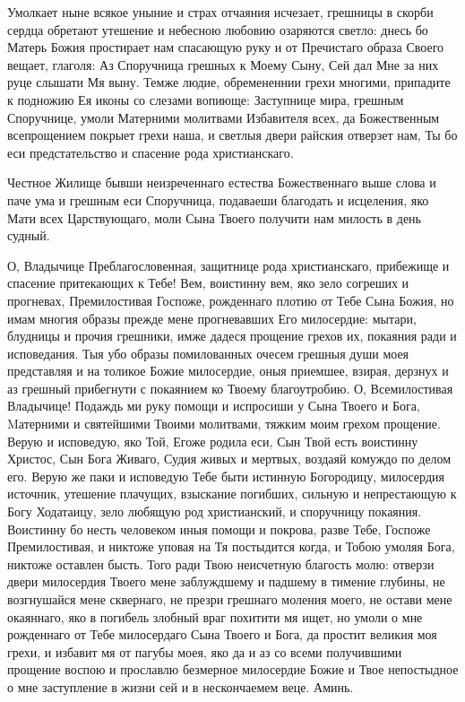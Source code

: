 \begin{mymulticols}



Умолкает ныне всякое уныние и страх отчаяния исчезает, грешницы в скорби сердца обретают утешение и небесною любовию озаряются светло: днесь бо Матерь Божия простирает нам спасающую руку и от Пречистаго образа Своего вещает, глаголя: Аз Споручница грешных к Моему Сыну, Сей дал Мне за них руце слышати Мя выну. Темже людие, обремененнии грехи многими, припадите к подножию Ея иконы со слезами вопиюще: Заступнице мира, грешным Споручнице, умоли Матерними молитвами Избавителя всех, да Божественным всепрощением покрыет грехи наша, и светлыя двери райския отверзет нам, Ты бо еси предстательство и спасение рода христианскаго.


Честное Жилище бывши неизреченнаго естества Божественнаго выше слова и паче ума и грешным еси Споручница, подаваеши благодать и исцеления, яко Мати всех Царствующаго, моли Сына Твоего получити нам милость в день судный.


О, Владычице Преблагословенная, защитнице рода христианскаго, прибежище и спасение притекающих к Тебе! Вем, воистинну вем, яко зело согреших и прогневах, Премилостивая Госпоже, рожденнаго плотию от Тебе Сына Божия, но имам многия образы прежде мене прогневавших Его милосердие: мытари, блудницы и прочия грешники, имже дадеся прощение грехов их, покаяния ради и исповедания. Тыя убо образы помилованных очесем грешныя души моея представляя и на толикое Божие милосердие, оныя приемшее, взирая, дерзнух и аз грешный прибегнути с покаянием ко Твоему благоутробию. О, Всемилостивая Владычице! Подаждь ми руку помощи и испросиши у Сына Твоего и Бога, Mатерними и святейшими Твоими молитвами, тяжким моим грехом прощение. Верую и исповедую, яко Той, Егоже родила еси, Сын Твой есть воистинну Христос, Сын Бога Живаго, Судия живых и мертвых, воздаяй комуждо по делом его. Верую же паки и исповедую Тебе быти истинную Богородицу, милосердия источник, утешение плачущих, взыскание погибших, сильную и непрестающую к Богу Ходатаицу, зело любящую род христианский, и споручницу покаяния. Воистинну бо несть человеком иныя помощи и покрова, разве Тебе, Госпоже Премилостивая, и никтоже уповая на Тя постыдится когда, и Тобою умоляя Бога, никтоже оставлен бысть. Того ради Твою неисчетную благость молю: отверзи двери милосердия Твоего мене заблуждшему и падшему в тимение глубины, не возгнушайся мене сквернаго, не презри грешнаго моления моего, не остави мене окаяннаго, яко в погибель злобный враг похитити мя ищет, но умоли о мне рожденнаго от Тебе милосердаго Сына Твоего и Бога, да простит великия моя грехи, и избавит мя от пагубы моея, яко да и аз со всеми получившими прощение воспою и прославлю безмерное милосердие Божие и Твое непостыдное о мне заступление в жизни сей и в нескончаемем веце. Аминь.

\end{mymulticols}

